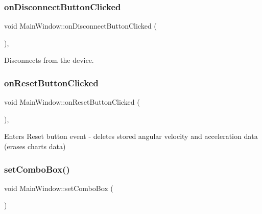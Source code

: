 \mbox{\label{class_main_window_a15190e6af528cd13ddbe387800531ba4}} 
\subsubsection{on\+Disconnect\+Button\+Clicked}
{\footnotesize\ttfamily void Main\+Window\+::on\+Disconnect\+Button\+Clicked (\begin{DoxyParamCaption}{ }\end{DoxyParamCaption})\hspace{0.3cm}{\ttfamily [private]}, {\ttfamily [slot]}}



Disconnects from the device. 

\mbox{\label{class_main_window_a680f2fc34bd2147a3a675060aca0fbc6}} 
\subsubsection{on\+Reset\+Button\+Clicked}
{\footnotesize\ttfamily void Main\+Window\+::on\+Reset\+Button\+Clicked (\begin{DoxyParamCaption}{ }\end{DoxyParamCaption})\hspace{0.3cm}{\ttfamily [private]}, {\ttfamily [slot]}}



Enters Reset button event -\/ deletes stored angular velocity and acceleration data (erases charts data) 

\mbox{\label{class_main_window_ad5f5900379db4ae670ad541da8f55384}} 
\subsubsection{set\+Combo\+Box()}
{\footnotesize\ttfamily void Main\+Window\+::set\+Combo\+Box (\begin{DoxyParamCaption}{ }\end{DoxyParamCaption})\hspace{0.3cm}{\ttfamily [private]}}



